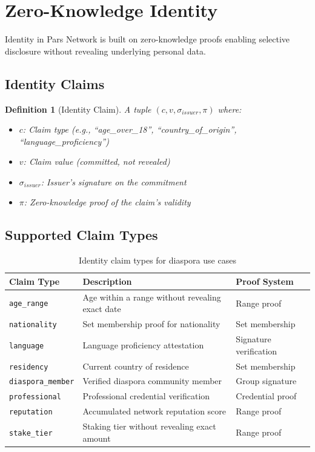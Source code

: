 \documentclass[11pt,a4paper]{article}
\newtheorem{definition}{Definition}
\begin{document}
\section{Zero-Knowledge Identity}
\label{sec:identity}

Identity in Pars Network is built on zero-knowledge proofs enabling selective disclosure without revealing underlying personal data.

\subsection{Identity Claims}

\begin{definition}[Identity Claim]
A tuple $(c, v, \sigma_{issuer}, \pi)$ where:
\begin{itemize}
    \item $c$: Claim type (e.g., ``age\_over\_18'', ``country\_of\_origin'', ``language\_proficiency'')
    \item $v$: Claim value (committed, not revealed)
    \item $\sigma_{issuer}$: Issuer's signature on the commitment
    \item $\pi$: Zero-knowledge proof of the claim's validity
\end{itemize}
\end{definition}

\subsection{Supported Claim Types}

\begin{table}[H]
\centering
\caption{Identity claim types for diaspora use cases}
\label{tab:claims}
\begin{tabularx}{\textwidth}{lXl}
\toprule
\textbf{Claim Type} & \textbf{Description} & \textbf{Proof System} \\
\midrule
\texttt{age\_range} & Age within a range without revealing exact date & Range proof \\
\texttt{nationality} & Set membership proof for nationality & Set membership \\
\texttt{language} & Language proficiency attestation & Signature verification \\
\texttt{residency} & Current country of residence & Set membership \\
\texttt{diaspora\_member} & Verified diaspora community member & Group signature \\
\texttt{professional} & Professional credential verification & Credential proof \\
\texttt{reputation} & Accumulated network reputation score & Range proof \\
\texttt{stake\_tier} & Staking tier without revealing exact amount & Range proof \\
\bottomrule
\end{tabularx}
\end{table}
\end{document}
